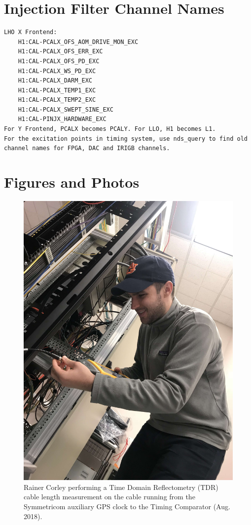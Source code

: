 \documentclass{article}
\begin{document}
\section{Injection Filter Channel Names}
\label{sec:channels}
\begin{lstlisting}
LHO X Frontend:
    H1:CAL-PCALX_OFS_AOM_DRIVE_MON_EXC
    H1:CAL-PCALX_OFS_ERR_EXC
    H1:CAL-PCALX_OFS_PD_EXC
    H1:CAL-PCALX_WS_PD_EXC
    H1:CAL-PCALX_DARM_EXC
    H1:CAL-PCALX_TEMP1_EXC
    H1:CAL-PCALX_TEMP2_EXC
    H1:CAL-PCALX_SWEPT_SINE_EXC
    H1:CAL-PINJX_HARDWARE_EXC
For Y Frontend, PCALX becomes PCALY. For LLO, H1 becomes L1.
For the excitation points in timing system, use nds_query to find old channel names for FPGA, DAC and IRIGB channels. 
\end{lstlisting}
\clearpage

\section{Figures and Photos}
\label{sec:figures}
\begin{figure}[!htb]
	\begin{center}
		\includegraphics[width=0.8\linewidth]{img/rainer-performing-tdr.jpg}
	\end{center}
	\caption{Rainer Corley performing a Time Domain Reflectometry (TDR) cable length measurement on the cable running from the Symmetricom auxiliary GPS clock to the Timing Comparator (Aug. 2018).}
	\label{fig:rainertdr}
\end{figure}
\end{document}
